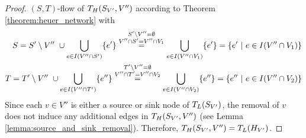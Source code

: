 \begin{proof}
$(S,T)$-flow of $T_H(S_{V'},V'')$ according to Theorem \ref{theorem:heuer_network}
with
\begin{align*}
S = S' \setminus V''\ \cup \bigcup\limits_{e \in I(V'' \cap S')} \{e'\} \stackrel{\substack{S'\setminus V'' = \emptyset \\ V'' \cap S' = V'' \cap V_1}}{=} \bigcup\limits_{e \in I(V'' \cap V_1)} \{e'\} = \{e'\ |\ e \in I(V'' \cap V_1)\} \\
T = T' \setminus V''\ \cup \bigcup\limits_{e \in I(V'' \cap T')} \{e''\} \stackrel{\substack{T'\setminus V'' = \emptyset \\ V'' \cap T' = V'' \cap V_2}}{=} \bigcup\limits_{e \in I(V'' \cap V_2)} \{e''\} = \{e''\ |\ e \in I(V'' \cap V_2)\}
\end{align*}
Since each $v \in V''$ is either a source or sink node of $T_L(S_{V'})$, the 
removal of $v$ does not induce any additional edges in $T_H(S_{V'},V'')$
(see Lemma \ref{lemma:source_and_sink_removal}). Therefore,
$T_H(S_{V'},V'') = T_L(H_{V'})$.
\end{proof}


